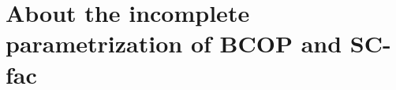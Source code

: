 
    
    



\section{About the incomplete parametrization of BCOP and SC-fac} \label{sec:ap_incomplete}


